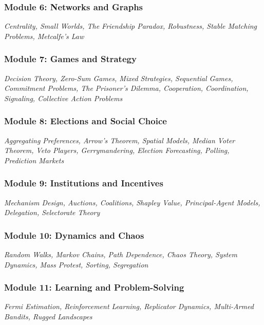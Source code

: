 \documentclass[11pt, letterpaper]{article}
\begin{document}
\subsubsection*{Module 6: Networks and Graphs}
\textit{Centrality, Small Worlds, The Friendship Paradox, Robustness, Stable Matching Problems, Metcalfe's Law}

\subsubsection*{Module 7: Games and Strategy}
\textit{Decision Theory, Zero-Sum Games, Mixed Strategies, Sequential Games, Commitment Problems, The Prisoner's Dilemma, Cooperation, Coordination, Signaling, Collective Action Problems}

\subsubsection*{Module 8: Elections and Social Choice}
\textit{Aggregating Preferences, Arrow's Theorem, Spatial Models, Median Voter Theorem, Veto Players, Gerrymandering, Election Forecasting, Polling, Prediction Markets}

\subsubsection*{Module 9: Institutions and Incentives}
\textit{Mechanism Design, Auctions, Coalitions, Shapley Value, Principal-Agent Models, Delegation, Selectorate Theory}

\subsubsection*{Module 10: Dynamics and Chaos}
\textit{Random Walks, Markov Chains, Path Dependence, Chaos Theory, System Dynamics, Mass Protest, Sorting, Segregation}

\subsubsection*{Module 11: Learning and Problem-Solving}
\textit{Fermi Estimation, Reinforcement Learning, Replicator Dynamics, Multi-Armed Bandits, Rugged Landscapes}


\end{document}
